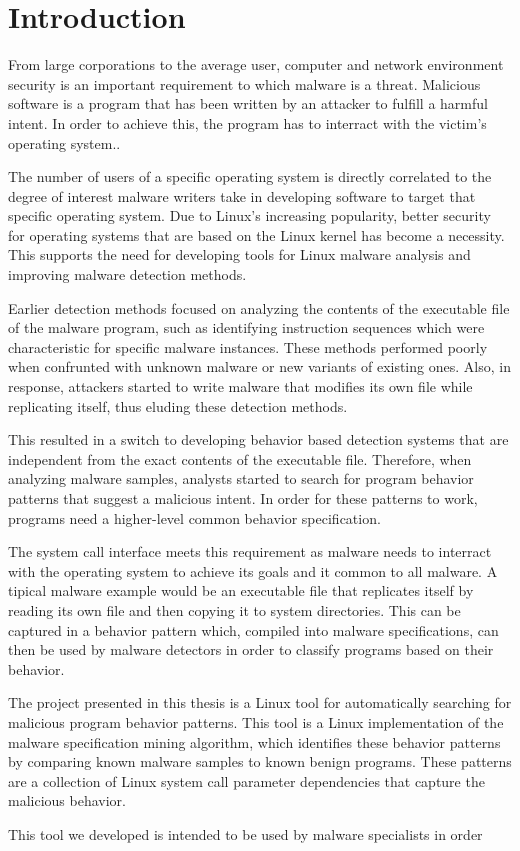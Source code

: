 \chapter{Introduction}
\label{chapter:intro}

From large corporations to the average user, computer and network environment security is an important requirement to which malware is a threat. Malicious software is a program that has been written by an attacker to fulfill a harmful intent. In order to achieve this, the program has to interract with the victim's operating system..

The number of users of a specific operating system is directly correlated to the degree of interest malware writers take in developing software to target that specific operating system. Due to Linux's increasing popularity, better security for operating systems that are based on the Linux kernel has become a necessity. This supports the need for developing tools for Linux malware analysis and improving malware detection methods.

Earlier detection methods focused on analyzing the contents of the executable file of the malware program, such as identifying instruction sequences which were characteristic for specific malware instances. These methods performed poorly when confrunted with unknown malware or new variants of existing ones. Also, in response, attackers started to write malware that modifies its own file while replicating itself, thus eluding these detection methods.

This resulted in a switch to developing behavior based detection systems that are independent from the exact contents of the executable file. Therefore, when analyzing malware samples, analysts started to search for program behavior patterns that suggest a malicious intent. In order for these patterns to work, programs need a higher-level common behavior specification.

The system call interface meets this requirement as malware needs to interract with the operating system to achieve its goals and it common to all malware. A tipical malware example would be an executable file that replicates itself by reading its own file and then copying it to system directories. This can be captured in a behavior pattern which, compiled into malware specifications, can then be used by malware detectors in order to classify programs based on their behavior.

The project presented in this thesis is a Linux tool for automatically searching for malicious program behavior patterns. This tool is a Linux implementation of the malware specification mining algorithm, which identifies these behavior patterns by comparing known malware samples to known benign programs. These patterns are a collection of Linux system call parameter dependencies that capture the malicious behavior.

This tool we developed is intended to be used by malware specialists in order